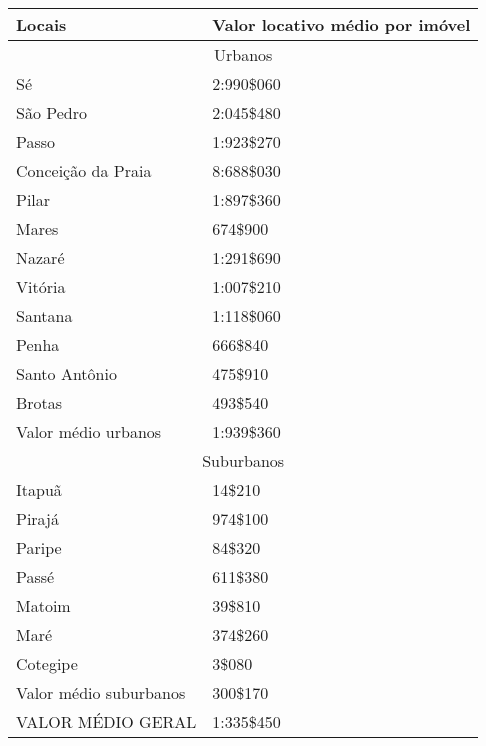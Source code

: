 \begin{sidewaystable}[!htp]
{
\begin{tabular}{ll}
\hline
Locais	&Valor locativo médio por imóvel\\
\hline
\hline
\multicolumn{2}{c}{Urbanos}\\
\hline
Sé	&2:990\$060\\
São Pedro	&2:045\$480\\
Passo	&1:923\$270\\
Conceição da Praia	&8:688\$030\\
Pilar	&1:897\$360\\
Mares	&674\$900\\
Nazaré	&1:291\$690\\
Vitória	&1:007\$210\\
Santana	&1:118\$060\\
Penha	&666\$840\\
Santo Antônio	&475\$910\\
Brotas	&493\$540\\
Valor médio urbanos	&1:939\$360\\
\hline
\multicolumn{2}{c}{Suburbanos}\\
\hline
Itapuã	&14\$210\\
Pirajá	&974\$100\\
Paripe	&84\$320\\
Passé	&611\$380\\
Matoim	&39\$810\\
Maré	&374\$260\\
Cotegipe	&3\$080\\
Valor médio suburbanos	&300\$170\\
\hline
VALOR MÉDIO GERAL	&1:335\$450\\
\hline
\end{tabular} 
}
{}
\end{sidewaystable}